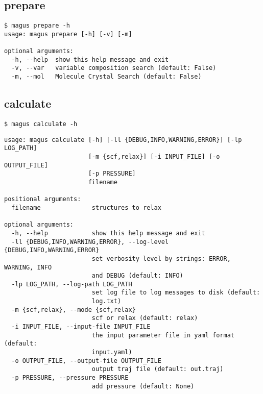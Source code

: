 \documentclass[12pt,oneside]{book}
\begin{document}
\subsection{prepare}
\begin{tcolorbox}
    \begin{verbatim}
$ magus prepare -h
usage: magus prepare [-h] [-v] [-m]

optional arguments:
  -h, --help  show this help message and exit
  -v, --var   variable composition search (default: False)
  -m, --mol   Molecule Crystal Search (default: False)
    \end{verbatim}
\end{tcolorbox}
\subsection{calculate}
\begin{tcolorbox}
    \begin{verbatim}
$ magus calculate -h
    \end{verbatim}
    \tcblower
    \begin{verbatim}
usage: magus calculate [-h] [-ll {DEBUG,INFO,WARNING,ERROR}] [-lp LOG_PATH]
                       [-m {scf,relax}] [-i INPUT_FILE] [-o OUTPUT_FILE]
                       [-p PRESSURE]
                       filename

positional arguments:
  filename              structures to relax

optional arguments:
  -h, --help            show this help message and exit
  -ll {DEBUG,INFO,WARNING,ERROR}, --log-level {DEBUG,INFO,WARNING,ERROR}
                        set verbosity level by strings: ERROR, WARNING, INFO
                        and DEBUG (default: INFO)
  -lp LOG_PATH, --log-path LOG_PATH
                        set log file to log messages to disk (default:
                        log.txt)
  -m {scf,relax}, --mode {scf,relax}
                        scf or relax (default: relax)
  -i INPUT_FILE, --input-file INPUT_FILE
                        the input parameter file in yaml format (default:
                        input.yaml)
  -o OUTPUT_FILE, --output-file OUTPUT_FILE
                        output traj file (default: out.traj)
  -p PRESSURE, --pressure PRESSURE
                        add pressure (default: None)
    \end{verbatim}
\end{tcolorbox}
\end{document}
